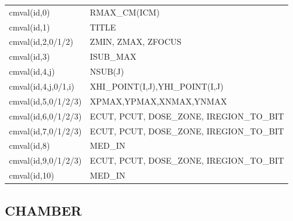 \documentclass[12pt]{book}
\begin{document}
\begin{tabular}{|p{4.5cm}|p{11.5cm}|}\hline
cmval(id,0) &  RMAX\_CM(ICM)\\
cmval(id,1) &  TITLE \\
cmval(id,2,0/1/2) &  ZMIN, ZMAX, ZFOCUS\\
cmval(id,3) &  ISUB\_MAX \\
cmval(id,4,j) &  NSUB(J)\\
cmval(id,4,j,0/1,i) &  XHI\_POINT(I,J),YHI\_POINT(I,J)\\
cmval(id,5,0/1/2/3) & XPMAX,YPMAX,XNMAX,YNMAX\\
cmval(id,6,0/1/2/3) &   ECUT, PCUT, DOSE\_ZONE, IREGION\_TO\_BIT \\
cmval(id,7,0/1/2/3) &   ECUT, PCUT, DOSE\_ZONE, IREGION\_TO\_BIT \\
cmval(id,8) & MED\_IN \\
cmval(id,9,0/1/2/3) & ECUT, PCUT, DOSE\_ZONE, IREGION\_TO\_BIT \\
cmval(id,10) & MED\_IN \\ \hline
\end{tabular}

\subsection{CHAMBER}
\end{document}
